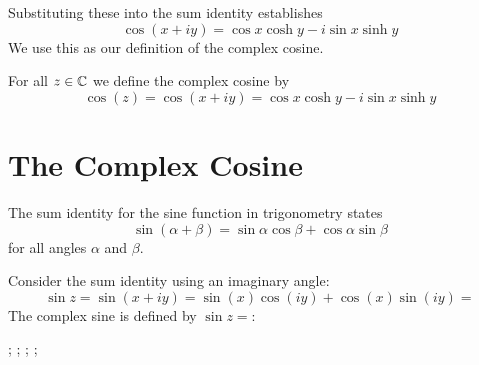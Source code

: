 \documentclass[handout]{ximera}
\begin{document}
Substituting these into the sum identity establishes
\[
\cos(x+iy) = \cos x \cosh y - i\sin x \sinh y
\]
We use this as our definition of the complex cosine.
\begin{definition}
For all $z \in \mathbb C$ we define the complex cosine by
\[
\cos(z) = \cos(x+iy) = \cos x \cosh y - i\sin x \sinh y
\]
\end{definition}


\section{The Complex Cosine}


The sum identity for the sine function in trigonometry states
\[
\sin(\alpha + \beta) = \sin \alpha \cos \beta + \cos \alpha \sin \beta
\]
for all angles $\alpha$ and $\beta$.
\begin{question}
Consider the sum identity using an imaginary angle:
\[
\sin{z} = \sin(x+iy) = \sin(x) \cos(iy) + \cos(x) \sin(iy) =
\]
The complex sine is defined by $\sin z =$:
\begin{multipleChoice}
;
;
;
;
\end{multipleChoice}
\end{question}
\end{document}
